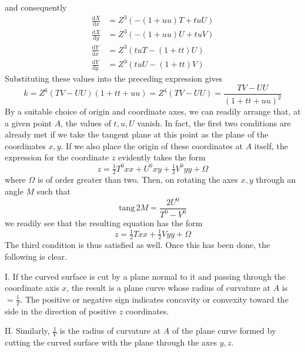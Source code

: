 %
and consequently
\[
\begin{aligned}
\frac{\mathrm{d}X}{\mathrm{d}x}&=Z^3(-(1+uu)T+tuU)\\
\frac{\mathrm{d}X}{\mathrm{d}y}&=Z^3(-(1+uu)U+tuV)\\
\frac{\mathrm{d}Y}{\mathrm{d}x}&=Z^3(tuT-(1+tt)U)\\
\frac{\mathrm{d}Y}{\mathrm{d}y}&=Z^3(tuU-(1+tt)V)
\end{aligned}
\]
Substituting these values into the preceding expression gives
\[
k=Z^6(TV-UU)(1+tt+uu)=Z^4(TV-UU)=\frac{TV-UU}{(1+tt+uu)^2}
\]
By a suitable choice of origin and coordinate axes, we can readily arrange that, at a given point \(A\), the values of \(t,u,U\) vanish. In fact, the first two conditions are already met if we take the tangent plane at this point as the plane of the coordinates \(x,y\). If we also place the origin of these coordinates at \(A\) itself, the expression for the coordinate \(z\) evidently takes the form
\[
z=\tfrac{1}{2}T^0xx+U^0xy+\tfrac{1}{2}V^0yy+\Omega
\]
where \(\Omega\) is of order greater than two. Then, on rotating the axes \(x,y\) through an angle \(M\) such that
\[
\mathrm{tang}\,2M=\frac{2U^0}{T^0-V^0}
\]
we readily see that the resulting equation has the form
\[
z=\tfrac{1}{2}Txx+\tfrac{1}{2}Vyy+\Omega
\]
The third condition is thus satisfied as well. Once this has been done, the following is clear.

I. If the curved surface is cut by a plane normal to it and passing through the coordinate axis \(x\), the result is a plane curve whose radius of curvature at \(A\) is \(=\frac{1}{T}\). The positive or negative sign indicates concavity or convexity toward the side in the direction of positive \(z\) coordinates.

II. Similarly, \(\frac{1}{V}\) is the radius of curvature at \(A\) of the plane curve formed by cutting the curved surface with the plane through the axes \(y,z\).
